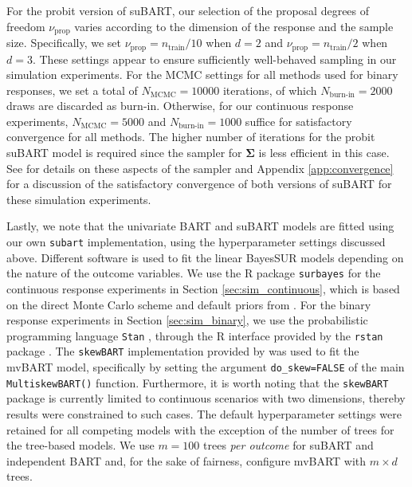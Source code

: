 \documentclass[aoas,preprint]{imsart}
\theoremstyle{plain}
\theoremstyle{definition}
\theoremstyle{remark}
\begin{document}
For the probit version of suBART, our selection of the proposal degrees of freedom $\nu_{\operatorname{prop}}$ varies according to the dimension of the response and the sample size. 
Specifically, we set $\nu_{\operatorname{prop}}=n_{\operatorname{train}}/10$ when $d=2$ and $\nu_{\operatorname{prop}}=n_{\operatorname{train}}/2$ when $d=3$. These settings appear to ensure sufficiently well-behaved sampling in our simulation experiments. For the MCMC settings for all methods used for binary responses, we set a total of $N_{\operatorname{MCMC}} = 10000$ iterations, of which $N_{\operatorname{burn-in}} = 2000$ draws are discarded as burn-in. Otherwise, for our continuous response experiments, $N_{\operatorname{MCMC}}=5000$ and $N_{\operatorname{burn-in}}=1000$ suffice for satisfactory convergence for all methods. The higher number of iterations for the probit suBART  model is required since the sampler for $\boldsymbol{\Sigma}$ is less efficient in this case. See \citet{zhang2006sampling} for details on these aspects of the sampler
and Appendix \ref{app:convergence} for a discussion of the satisfactory convergence of both versions of suBART for these simulation experiments.

Lastly, we note 
that the univariate BART and suBART models are fitted using our own \texttt{subart} implementation, using the hyperparameter settings discussed above. Different software is used to fit the linear BayesSUR models depending on the nature of the outcome variables. We use the \textsf{R} package \texttt{surbayes} \citep{alt2020surbayes} for the continuous response experiments in Section \ref{sec:sim_continuous}, which is based on the direct Monte Carlo scheme and default priors from \citet{zellner2010direct}. For the binary response experiments in Section \ref{sec:sim_binary}, we use the probabilistic programming language \texttt{Stan} \citep{stanusersguide}, through the \textsf{R} interface provided by the \texttt{rstan} package \citep{rstanref}.
The \texttt{skewBART} implementation provided by \citet{um2023bayesian} was used to fit the mvBART model, specifically by setting the argument \texttt{do\_skew=FALSE} of the main \texttt{MultiskewBART()} function.  
Furthermore, it is worth noting that the \texttt{skewBART} package is currently limited to continuous scenarios with two dimensions, thereby results were constrained to such cases. The default hyperparameter settings were retained for all competing models with the exception of the number of trees for the tree-based models. We use $m=100$ trees \textit{per outcome} for suBART and independent BART and, for the sake of fairness, configure mvBART with $m \times d$ trees.
\end{document}
